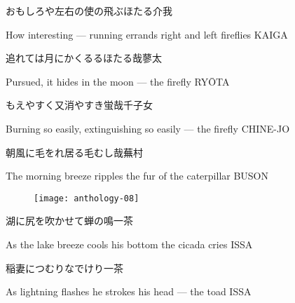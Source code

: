 \begin{haiku}
    {\FH おもしろや左右の使の飛ぶほたる}\hfill{\FH 介我}

    \vin{} How interesting ---
    \vin{} \vin{} running errands right and left
    \vin{} \vin{} \vin{} fireflies \hspace{\fill} KAIGA
\end{haiku}

\begin{haiku}
    {\FH 追れては月にかくるるほたる哉}\hfill{\FH 蓼太}

    \vin{} Pursued,
    \vin{} \vin{} it hides in the moon ---
    \vin{} \vin{} \vin{} the firefly \hspace{\fill} RY\={O}TA
\end{haiku}

\begin{haiku}
    {\FH もえやすく又消やすき蛍哉}\hfill{\FH 千子女}

    \vin{} Burning so easily,
    \vin{} \vin{} extinguishing so easily ---
    \vin{} \vin{} \vin{} the firefly \hspace{\fill} CHINE-JO
\end{haiku}

\begin{haiku}
    {\FH 朝風に毛をれ居る毛むし哉}\hfill{\FH 蕪村}

    \vin{} The morning breeze
    \vin{} \vin{} ripples the fur
    \vin{} \vin{} \vin{} of the caterpillar \hspace{\fill} BUSON
\end{haiku}

\begin{figure}
    \texttt{[image: anthology-08]}
\end{figure}

\begin{haiku}
    {\FH 湖に尻を吹かせて蝉の鳴}\hfill{\FH 一茶}

    \vin{} As the lake breeze
    \vin{} \vin{} cools his bottom
    \vin{} \vin{} \vin{} the cicada cries \hspace{\fill} ISSA
\end{haiku}

\begin{haiku}
    {\FH 稲妻につむりなでけり}\hfill{\FH 一茶}

    \vin{} As lightning flashes
    \vin{} \vin{} he strokes his head ---
    \vin{} \vin{} \vin{} the toad \hspace{\fill} ISSA
\end{haiku}

